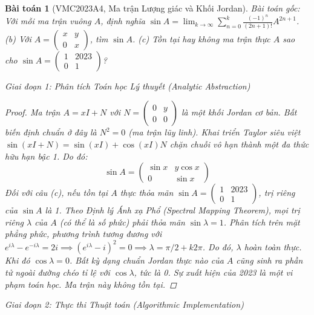 \documentclass{article}
\newtheorem{baitoan}{Bài toán}
\begin{document}
\begin{baitoan}[VMC2023A4, Ma trận Lượng giác và Khối Jordan]
 \emph{Bài toán gốc:} 
 Với mỗi ma trận vuông $A$, định nghĩa $\sin A = \lim_{k\to\infty} \sum_{n=0}^k \frac{(-1)^n}{(2n + 1)!}A^{2n + 1}$.
 (b) Với $A = \begin{pmatrix} x & y\\0 & x \end{pmatrix}$, tìm $\sin A$. (c) Tồn tại hay không ma trận thực $A$ sao cho $\sin A = \begin{pmatrix} 1 & 2023\\0 & 1 \end{pmatrix}$?

\vspace{0.5em}\noindent\emph{Giai đoạn 1: Phân tích Toán học Lý thuyết (Analytic Abstraction)}
 
\begin{proof}
 Ma trận $A = xI + N$ với $N = \begin{pmatrix} 0 & y \\ 0 & 0 \end{pmatrix}$ là một khối Jordan cơ bản. Bất biến định chuẩn ở đây là $N^2 = 0$ (ma trận lũy linh).
 Khai triển Taylor siêu việt $\sin(xI + N) = \sin(xI) + \cos(xI)N$ chặn chuỗi vô hạn thành một đa thức hữu hạn bậc 1. Do đó:
 \begin{equation}
 \sin A = \begin{pmatrix} \sin x & y \cos x \\ 0 & \sin x \end{pmatrix}
 \end{equation}
 Đối với câu (c), nếu tồn tại $A$ thực thỏa mãn $\sin A = \begin{pmatrix} 1 & 2023 \\ 0 & 1 \end{pmatrix}$, trị riêng của $\sin A$ là 1. Theo Định lý Ánh xạ Phổ (Spectral Mapping Theorem), mọi trị riêng $\lambda$ của $A$ (có thể là số phức) phải thỏa mãn $\sin \lambda = 1$. Phân tích trên mặt phẳng phức, phương trình tương đương với $e^{i\lambda} - e^{-i\lambda} = 2i \implies (e^{i\lambda} - i)^2 = 0 \implies \lambda = \pi/2 + k2\pi$. Do đó, $\lambda$ hoàn toàn thực. Khi đó $\cos \lambda = 0$. Bất kỳ dạng chuẩn Jordan thực nào của $A$ cũng sinh ra phần tử ngoài đường chéo tỉ lệ với $\cos \lambda$, tức là 0. Sự xuất hiện của 2023 là một vi phạm toán học. Ma trận này không tồn tại.
 \end{proof}

\vspace{0.5em}\noindent\emph{Giai đoạn 2: Thực thi Thuật toán (Algorithmic Implementation)}
 

\end{baitoan}
\end{document}
